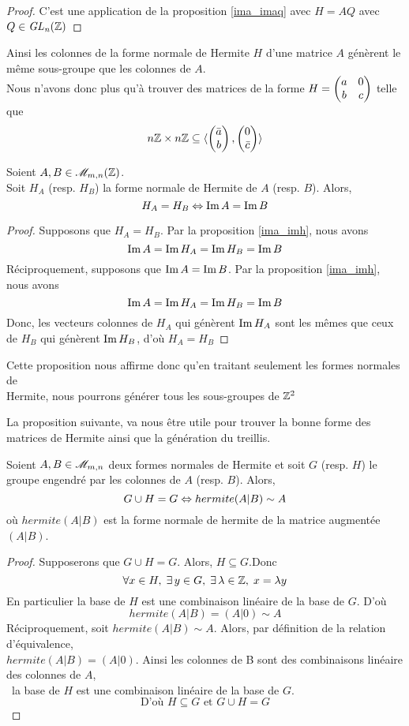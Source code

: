 \documentclass[12pt]{article}
\begin{document}
\begin{proof}
	C'est une application de la proposition \ref{ima_imaq} avec $H= AQ$ avec $Q \in \it {GL}_n(\mathbb Z)$

\end{proof}

Ainsi les colonnes de la forme normale de Hermite $H$ d'une matrice $A$ génèrent le même
sous-groupe que les colonnes de $A$.\\
Nous n'avons donc plus qu'à trouver des matrices de la forme
$H = \begin{pmatrix} a & 0\\ b & c \end{pmatrix}$ telle que
$$n\mathbb Z \times n\mathbb Z \subseteq \langle \begin{pmatrix} \bar a\\ b \end{pmatrix},\begin{pmatrix} 0\\ \bar c \end{pmatrix} \rangle$$

\begin{proposition}\label{ha_hb_ssi_ima_imb}
	Soient $A,B \in \mathscr{M}_{m,n}(\mathbb Z)$.\\
	Soit $H_A$ (resp. $H_B$) la forme normale de Hermite de $A$ (resp. $B$). Alors,
	$$ H_A = H_B \Leftrightarrow \operatorname{Im} A = \operatorname{Im} B$$
\end{proposition}

\begin{proof}
	Supposons que $H_A = H_B$.	Par la proposition \ref{ima_imh}, nous avons
	$$\operatorname{Im} A = \operatorname{Im} H_A = \operatorname{Im} H_B = \operatorname{Im} B$$
	Réciproquement, supposons que $\operatorname{Im} A = \operatorname{Im} B$. Par la proposition \ref{ima_imh}, nous avons
	$$\operatorname{Im} A = \operatorname{Im} H_A = \operatorname{Im} H_B = \operatorname{Im} B$$
	Donc, les vecteurs colonnes de $H_A$ qui génèrent $\operatorname{Im} H_A$ sont les mêmes que ceux de
	$H_B$ qui génèrent $\operatorname{Im} H_B$, d'où $H_A = H_B$

\end{proof}

\newpage
Cette proposition nous affirme donc qu'en traitant seulement les formes normales de \\
Hermite, nous pourrons générer tous les sous-groupes de $\mathbb Z^2$

La proposition suivante, va nous être utile pour trouver la bonne forme des matrices de Hermite
ainsi que la génération du treillis.

\begin{proposition}\label{guh_g_ssi_a_sim_b}
	Soient $A,B \in \mathscr{M}_{m,n}$ deux formes normales de Hermite et soit $G$ (resp. $H$) le
	groupe engendré par les colonnes de $A$ (resp. $B$). Alors,
	$$G \cup H = G \Leftrightarrow hermite(A | B) \sim A$$
	où $hermite(A|B)$ est la forme normale de hermite de la matrice augmentée $(A | B)$.
\end{proposition}

\begin{proof}
	Supposerons que $G \cup H = G$. Alors, $ H \subseteq G$.Donc
	$$\forall x \in H , \;  \exists \, y \in G , \; \exists \, \lambda \in \mathbb Z , \; x = \lambda y$$
	En particulier la base de $H$ est une combinaison linéaire de la base de $G$. D'où
	$$hermite(A | B) = (A | 0) \sim A$$
	\noindent
	Réciproquement, soit $hermite(A | B) \sim A$. Alors, par définition de la relation
	d'équivalence,\\
	$hermite(A | B) = (A | 0)$. Ainsi les colonnes de B sont des combinaisons linéaire des
	colonnes de $A$,\\
	\cad \, la base de $H$ est une combinaison linéaire de la base de $G$.
	$$\text{D'où } H \subseteq G \text{ et } G \cup H = G$$
\end{proof}
\end{document}

